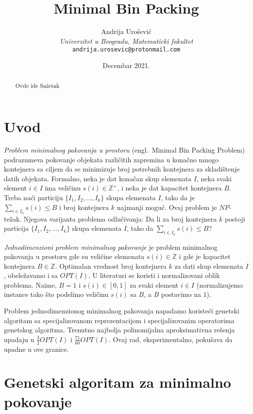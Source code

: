 \documentclass[a4paper,12pt,twocolumn]{article}
\title{Minimal Bin Packing}
\author{Andrija Urošević\\\textit{Univerzitet u Beogradu, Matematicki fakultet}\\\texttt{andrija.urosevic@protonmail.com}}
\date{Decembar 2021.}
\begin{document}
\maketitle

\begin{abstract}
    Ovde ide Sažetak
\end{abstract}

\section{Uvod}

\emph{Problem minimalnog pakovanja u prostoru} 
(engl.\ Minimal Bin Packing Problem) podrazumeva pokovanje objekata 
različitih zapremina u konačno mnogo kontejnera sa ciljem da se minimizuje
broj potrebnih kontejnera za skladištenje datih objekata. Formalno, neka je
dat konačan skup elemenata $I$, neka svaki element $i \in I$ ima veličinu 
$s(i) \in \mathbb{Z}^{+}$, i neka je dat kapacitet kontejnera $B$. Treba naći
particiju $\{I_1, I_2, \ldots, I_k\}$ skupa elemenata $I$, tako da je 
$\sum_{i \in I_k} s(i) \leq B$ i broj kontejnera $k$ najmanji moguć. 
Ovaj problem je $NP$-težak\cite{gj80}. Njegova varijanta problema odlučivanja:
Da li za broj kontejnera $k$ postoji particija $\{I_1, I_2, \ldots, I_k\}$
skupa elemenata $I$, tako da $\sum_{i \in I_k} s(i) \leq B$? 

\emph{Jednodimenzioni problem minimalnog pakovanje} je problem minimalnog 
pakovanja u prostoru gde su veličine elemenata $s(i) \in \mathbb{Z}$ i 
gde je kapacitet kontejnera $B \in \mathbb{Z}$. Optimalan vrednost broj 
kontejnera $k$ za dati skup elemenata $I$, obeležavamo i sa $OPT(I)$.
U literaturi se koristi i normalizovani oblik problema. Naime, $B = 1$ i
$s(i) \in [0, 1]$ za svaki element $i \in I$ (normalizujemo instance tako što
podelimo veličinu $s(i)$ sa $B$, a $B$ postavimo na $1$). 

Problem jednodimenzionog minimalnog pakovanja napadamo
koristeći genetski algoritam sa specijalizovanom reprezentacijom i 
specijalizovanim operatorima genetskog algoritma. Trenutno najbolja 
polinomijalna aproksimativna rešenja upadaju u $\frac{3}{2} OPT(I)$\cite{sl94} 
i $\frac{71}{60} OPT(I)$\cite{jg85, yz95}. Ovaj rad, eksperimentalno, pokušava 
da upadne u ove granice.

\section{Genetski algoritam za minimalno pokovanje}
\end{document}
